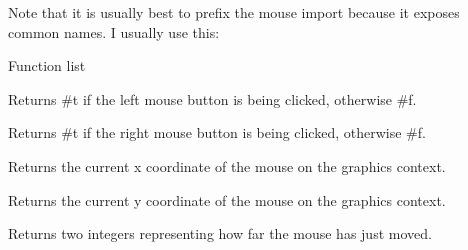 
Note that it is usually best to prefix the mouse import because it exposes common names. I usually use this:\newline
{}

Function list



Returns #t if the left mouse button is being clicked, otherwise #f.


Returns #t if the right mouse button is being clicked, otherwise #f.


Returns the current x coordinate of the mouse on the graphics context.


Returns the current y coordinate of the mouse on the graphics context.


Returns two integers representing how far the mouse has just moved.


